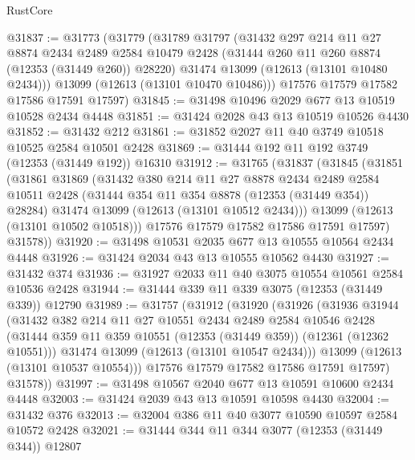 \begin{lexlean}{RustCore}
\begin{coremodule}
@31837 := @31773
    (@31779
      (@31789
        @31797
        (@31432
          @297
          @214
          @11
          @27
          @8874
          @2434
          @2489
          @2584
          @10479
          @2428
          (@31444 @260 @11 @260 @8874 (@12353 (@31449 @260)) @28220)
          @31474
          @13099
          (@12613 (@13101 @10480 @2434)))
        @13099
        (@12613 (@13101 @10470 @10486)))
      @17576
      @17579
      @17582
      @17586
      @17591
      @17597)
@31845 := @31498 @10496 @2029 @677 @13 @10519 @10528 @2434 @4448
@31851 := @31424 @2028 @43 @13 @10519 @10526 @4430
@31852 := @31432 @212
@31861 := @31852 @2027 @11 @40 @3749 @10518 @10525 @2584 @10501 @2428
@31869 := @31444 @192 @11 @192 @3749 (@12353 (@31449 @192)) @16310
@31912 := @31765
    (@31837
      (@31845
        (@31851
          (@31861
            @31869
            (@31432
              @380
              @214
              @11
              @27
              @8878
              @2434
              @2489
              @2584
              @10511
              @2428
              (@31444 @354 @11 @354 @8878 (@12353 (@31449 @354)) @28284)
              @31474
              @13099
              (@12613 (@13101 @10512 @2434)))
            @13099
            (@12613 (@13101 @10502 @10518)))
          @17576
          @17579
          @17582
          @17586
          @17591
          @17597)
        @31578))
@31920 := @31498 @10531 @2035 @677 @13 @10555 @10564 @2434 @4448
@31926 := @31424 @2034 @43 @13 @10555 @10562 @4430
@31927 := @31432 @374
@31936 := @31927 @2033 @11 @40 @3075 @10554 @10561 @2584 @10536 @2428
@31944 := @31444 @339 @11 @339 @3075 (@12353 (@31449 @339)) @12790
@31989 := @31757
    (@31912
      (@31920
        (@31926
          (@31936
            @31944
            (@31432
              @382
              @214
              @11
              @27
              @10551
              @2434
              @2489
              @2584
              @10546
              @2428
              (@31444 @359 @11 @359 @10551 (@12353 (@31449 @359)) (@12361 (@12362 @10551)))
              @31474
              @13099
              (@12613 (@13101 @10547 @2434)))
            @13099
            (@12613 (@13101 @10537 @10554)))
          @17576
          @17579
          @17582
          @17586
          @17591
          @17597)
        @31578))
@31997 := @31498 @10567 @2040 @677 @13 @10591 @10600 @2434 @4448
@32003 := @31424 @2039 @43 @13 @10591 @10598 @4430
@32004 := @31432 @376
@32013 := @32004 @386 @11 @40 @3077 @10590 @10597 @2584 @10572 @2428
@32021 := @31444 @344 @11 @344 @3077 (@12353 (@31449 @344)) @12807

\end{coremodule}
\end{lexlean}

